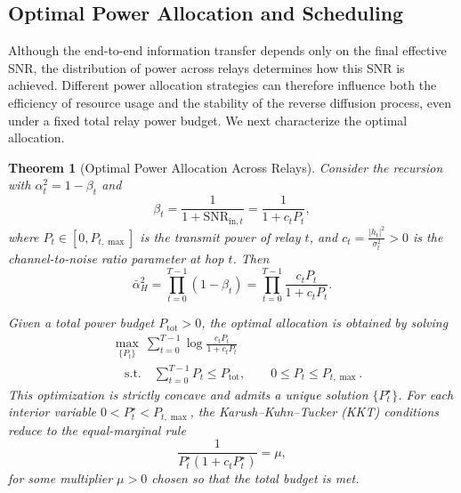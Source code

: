 \documentclass[journal]{IEEEtran}
\newtheorem{theorem}{Theorem}
\begin{document}
\subsection{Optimal Power Allocation and Scheduling}

Although the end-to-end information transfer depends only on the final effective SNR, 
the distribution of power across relays determines how this SNR is achieved. 
Different power allocation strategies can therefore influence both the efficiency 
of resource usage and the stability of the reverse diffusion process, even under 
a fixed total relay power budget. We next characterize the optimal allocation.

\begin{theorem}[Optimal Power Allocation Across Relays]\label{thm:equalization}
Consider the recursion with $\alpha_t^2 = 1-\beta_t$ and
\[
\beta_t = \frac{1}{1+\mathrm{SNR}_{\mathrm{in},t}}
= \frac{1}{1+c_t P_t}, 
\]
where $P_t\in[0,P_{t,\max}]$ is the transmit power of relay $t$, 
and $c_t=\frac{|h_t|^2}{\sigma_t^2}>0$ is the channel-to-noise ratio parameter at hop $t$. 
Then
\[
\bar\alpha_H^2=\prod_{t=0}^{T-1}(1-\beta_t)
=\prod_{t=0}^{T-1}\frac{c_tP_t}{1+c_tP_t}.
\]

Given a total power budget $P_{\mathrm{tot}}>0$, the optimal allocation is obtained by solving
\begin{align}\label{eq:opt}
&\max_{\{P_t\}}\ \sum_{t=0}^{T-1}\log\frac{c_tP_t}{1+c_tP_t}\\
&\quad \text{s.t.}\quad
\sum_{t=0}^{T-1} P_t \le P_{\mathrm{tot}},\qquad 
0 \le P_t \le P_{t,\max}.
\nonumber
\end{align}
This optimization is strictly concave and admits a unique solution $\{P_t^\star\}$. 
For each interior variable $0<P_t^\star<P_{t,\max}$, the Karush--Kuhn--Tucker (KKT) 
conditions reduce to the equal-marginal rule
\[
\frac{1}{P_t^\star(1+c_tP_t^\star)}=\mu,
\]
for some multiplier $\mu>0$ chosen so that the total budget is met. 
\end{theorem}
\end{document}
